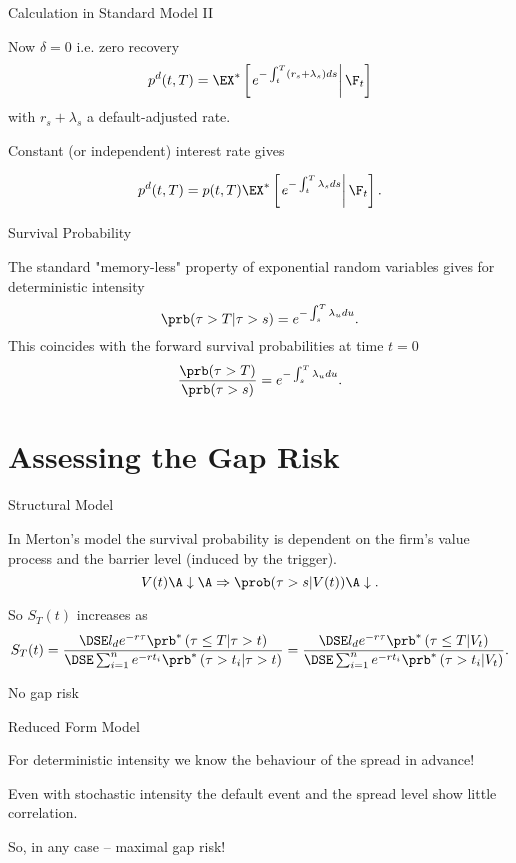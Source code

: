 {Calculation in Standard Model II}

Now $\delta=0$ i.e. zero recovery
$$
p^d (t,T) =  \EX^* \left[ \left.e^{-\int_t^T (r_s+ \lambda_s) ds} \right| \F_t\right]
$$
with $r_s+\lambda_s$ a default-adjusted rate.

Constant (or independent) interest rate gives

$$
p^d (t,T) =  p(t,T) \EX^* \left[ \left.e^{-\int_t^T \lambda_s ds} \right| \F_t\right].
$$

{Survival Probability}

The standard "memory-less" property of exponential random variables gives for deterministic intensity
$$
\prb(\tau > T | \tau >s) =   e^{-\int_s^T \lambda_udu}.
$$
This coincides with the forward survival probabilities at time $t=0$
$$
\frac{\prb(\tau > T)}{\prb(\tau>s)}=  e^{-\int_s^T \lambda_udu}.
$$

\section{Assessing the Gap Risk}

{Structural Model}







	In Merton's model the survival probability is dependent on the firm's value process and the barrier level (induced by the trigger).
$$
V(t) \A \downarrow \A \Rightarrow \prob(\tau > s |V(t)) \A \downarrow.
$$


	So $S_T(t)$ increases as
$$
S_T(t)=\frac{\DSE l_d e^{-r\tau} \prb^*\left(\tau\leq T  | \tau >t\right)} {\DSE\sum_{i=1}^n e^{-rt_i} \prb^*\left(\tau >t_i| \tau >t\right)}
=\frac{\DSE l_d e^{-r\tau} \prb^*\left(\tau\leq T  | V_t \right)} {\DSE\sum_{i=1}^n e^{-rt_i} \prb^*\left(\tau >t_i| V_t\right)}.
$$


	No gap risk





{Reduced Form Model}







	
For deterministic intensity we know the behaviour of the spread  in advance!


	
Even with stochastic intensity the default event and the spread level show little correlation.


	So, in any case  -- maximal gap risk!





